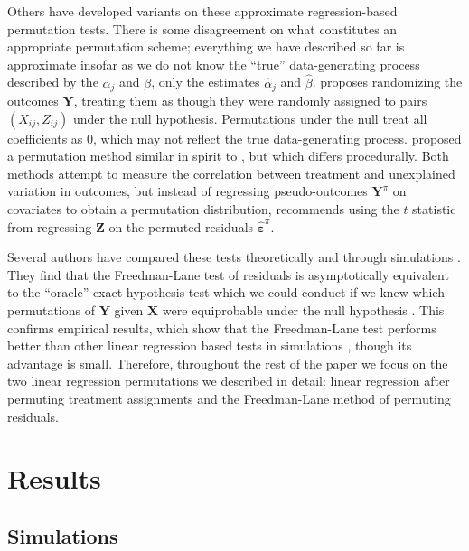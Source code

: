 \documentclass[12pt]{article}
\begin{document}
Others have developed variants on these approximate regression-based permutation tests. 
There is some disagreement on what constitutes an appropriate permutation scheme;
everything we have described so far is approximate insofar as we do not know the ``true'' data-generating process described by the $\alpha_j$ and $\beta$,
only the estimates $\hat{\alpha}_j$ and $\hat{\beta}$.
\cite{manly_randomization_2006} proposes randomizing the outcomes $\mathbf{Y}$, treating them as though they were randomly assigned to pairs $(X_{ij}, Z_{ij})$ under the null hypothesis.
Permutations under the null treat all coefficients as 0, which may not reflect the true data-generating process.
\cite{kennedy_randomization_1995} proposed a permutation method similar in spirit to \cite{freedman_nonstochastic_1983}, but which differs procedurally.
Both methods attempt to measure the correlation between treatment and unexplained variation in outcomes, but
instead of regressing pseudo-outcomes $\mathbf{Y}^\pi$ on covariates to obtain a permutation distribution, \cite{kennedy_randomization_1995} recommends using the $t$ statistic from regressing $\mathbf{Z}$ on the permuted residuals $\mathbf{\hat{\varepsilon}}^\pi$. 

Several authors have compared these tests theoretically and through simulations \cite{anderson_empirical_1999, anderson_permutation_2001, kennedy_randomization_1996}.
They find that the Freedman-Lane test of residuals is asymptotically equivalent to the ``oracle'' exact hypothesis test which we could conduct if we knew which permutations of $\mathbf{Y}$ given $\mathbf{X}$ were equiprobable under the null hypothesis \cite{anderson_permutation_2001}.
This confirms empirical results, which show that the Freedman-Lane test performs better than other linear regression based tests in simulations \cite{anderson_empirical_1999}, though its advantage is small.
Therefore, throughout the rest of the paper we focus on the two linear regression permutations we described in detail: linear regression after permuting treatment assignments and the Freedman-Lane method of permuting residuals.


\section{Results}
\subsection{Simulations}\label{simulations}
\end{document}
